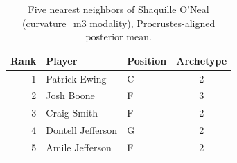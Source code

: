 \begin{table}[htbp]
  \centering\small
  \begin{tabular}{rllc}
    \toprule
    Rank & Player & Position & Archetype \\
    \midrule
    1 & Patrick Ewing & C & 2 \\
    2 & Josh Boone & F & 3 \\
    3 & Craig Smith & F & 2 \\
    4 & Dontell Jefferson & G & 2 \\
    5 & Amile Jefferson & F & 2 \\
    \bottomrule
  \end{tabular}
  \caption{Five nearest neighbors of Shaquille O'Neal (curvature_m3 modality), Procrustes-aligned posterior mean.}
  \label{tab:Shaquille_O_Neal_neighbors_curvature_m3}
\end{table}

